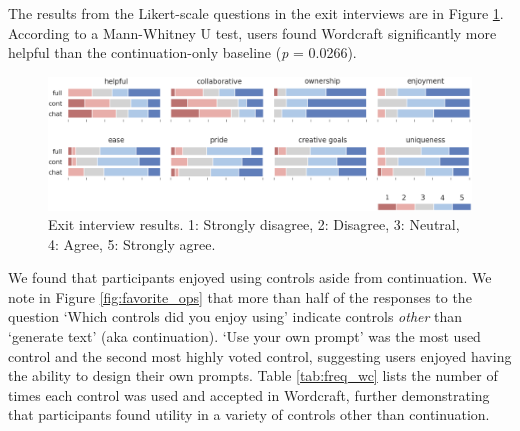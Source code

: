 




The results from the Likert-scale questions in the exit interviews are in Figure \ref{fig:exit_interview_results}. According to a Mann-Whitney U test, users found Wordcraft significantly more helpful than the continuation-only baseline (\textit{p} = 0.0266).

\begin{figure}[htb]
  \centering
  \includegraphics[width=0.8\linewidth]{figures/exit_interview_results.png}
  \caption{Exit interview results. 1: Strongly disagree, 2: Disagree, 3: Neutral, 4: Agree, 5: Strongly agree.}
  \label{fig:exit_interview_results}
\end{figure}

We found that participants enjoyed using controls aside from continuation.
We note in Figure \ref{fig:favorite_ops} that more than half of the responses to the question `Which controls did you enjoy using' indicate controls \textit{other} than `generate text' (aka continuation). `Use your own prompt' was the most used control and the second most highly voted control, suggesting users enjoyed having the ability to design their own prompts. Table \ref{tab:freq_wc} lists the number of times each control was used and accepted in Wordcraft, further demonstrating that participants found utility in a variety of controls other than continuation. 


